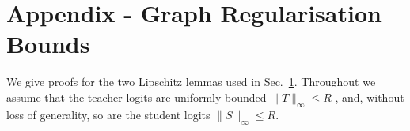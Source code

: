\documentclass{article}
\begin{document}


\section{Appendix - Graph Regularisation Bounds}
\label{sec:stability}
We give proofs for the two Lipschitz lemmas used in
Sec.~\ref{sec:stability}.
Throughout we assume that the teacher logits are uniformly bounded
\(\lVert T\rVert_{\infty}\le R\)
, and,
without loss of generality,
so are the student logits
\(\lVert S\rVert_{\infty}\le R\).
\end{document}
